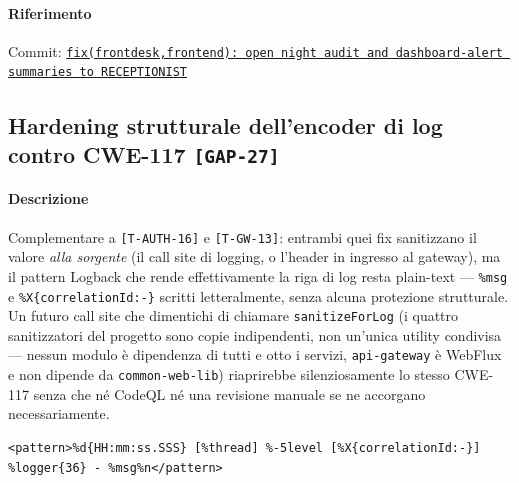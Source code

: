 ﻿\documentclass[a4paper,12pt]{report}
\newcommand{\commitref}[2]{\texttt{\small \href{https://github.com/diegoandruccioli/hotel-pms/commit/#1}{#2}}}
\newcommand{\threat}[1]{\texttt{\small\textcolor{vulnred}{[#1]}}}
\begin{document}
\paragraph{Riferimento} Commit: \commitref{bcf03b8e}{fix(frontdesk,frontend): open night audit and dashboard-alert summaries to RECEPTIONIST}

\subsection{Hardening strutturale dell'encoder di log contro CWE-117 \threat{GAP-27}}

\paragraph{Descrizione}
Complementare a \threat{T-AUTH-16} e \threat{T-GW-13}: entrambi quei fix
sanitizzano il valore \emph{alla sorgente} (il call site di logging, o
l'header in ingresso al gateway), ma il pattern Logback che rende
effettivamente la riga di log resta plain-text --- \texttt{\%msg} e
\texttt{\%X\{correlationId:-\}} scritti letteralmente, senza alcuna
protezione strutturale. Un futuro call site che dimentichi di chiamare
\texttt{sanitizeForLog} (i quattro sanitizzatori del progetto sono copie
indipendenti, non un'unica utility condivisa --- nessun modulo è dipendenza
di tutti e otto i servizi, \texttt{api-gateway} è WebFlux e non dipende da
\texttt{common-web-lib}) riaprirebbe silenziosamente lo stesso CWE-117 senza
che né CodeQL né una revisione manuale se ne accorgano necessariamente.

\begin{insecurebox}[title={logback-spring.xml --- pattern plain-text (baseline)}]
\begin{lstlisting}[style=xml]
<pattern>%d{HH:mm:ss.SSS} [%thread] %-5level [%X{correlationId:-}] %logger{36} - %msg%n</pattern>
\end{lstlisting}
\end{insecurebox}
\end{document}
